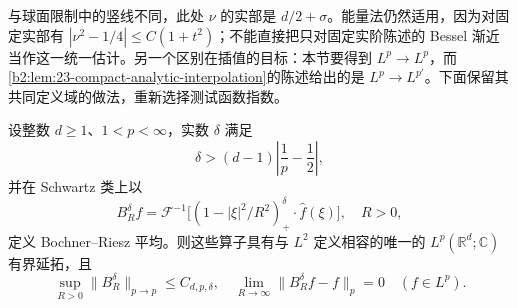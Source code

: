 与球面限制中的竖线不同，此处 \(\nu\) 的实部是 \(d/2+\sigma\)。能量法仍然适用，因为对固定实部有
\(|\nu^2-1/4|\leq C(1+t^2)\)；不能直接把只对固定实阶陈述的 Bessel 渐近当作这一统一估计。另一个区别在插值的目标：本节要得到 \(L^p\to L^p\)，而\cref{b2:lem:23-compact-analytic-interpolation}的陈述给出的是 \(L^p\to L^{p'}\)。下面保留其共同定义域的做法，重新选择测试函数指数。

\begin{theorem}[可直接证明的插值范围]\label{b2:thm:24-interpolation-range}
设整数 \(d\geq1\)、\(1<p<\infty\)，实数 \(\delta\) 满足
\[
 \delta>(d-1)\left|\frac1p-\frac12\right|,
\]
并在 Schwartz 类上以
\[
 B_R^\delta f=\mathcal F^{-1}
 \bigl[(1-|\xi|^2/R^2)_+^\delta\cdot\widehat f(\xi)\bigr],
 \quad R>0,
\]
定义 Bochner--Riesz 平均。则这些算子具有与 \(L^2\) 定义相容的唯一的 \(L^p(\mathbb R^d;\mathbb C)\) 有界延拓，且
\[
 \sup_{R>0}\|B_R^\delta\|_{p\to p}\leq C_{d,p,\delta},
 \quad
 \lim_{R\to\infty}\|B_R^\delta f-f\|_p=0
 \quad(f\in L^p).
\]
\end{theorem}
